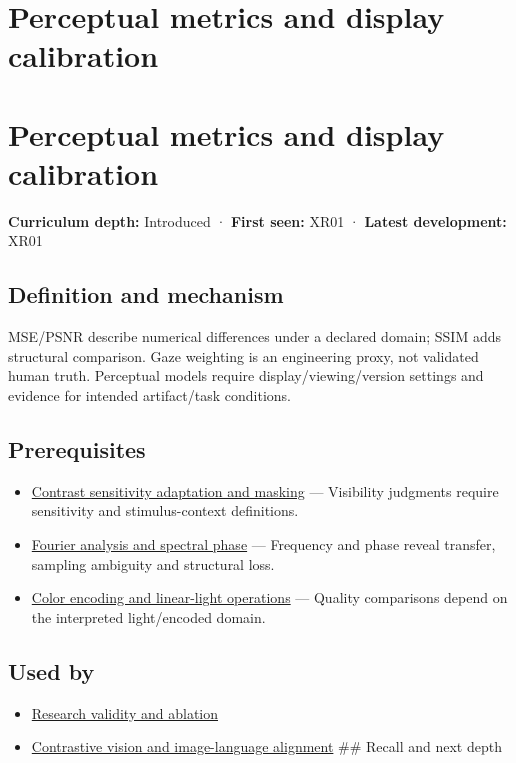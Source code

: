 \hypertarget{appendix-b2c1846508bf}{}
\section*{Perceptual metrics and display calibration}
\section{Perceptual metrics and display calibration}\label{perceptual-metrics-and-display-calibration}

\textbf{Curriculum depth:} Introduced · \textbf{First seen:} XR01 · \textbf{Latest development:} XR01

\subsection{Definition and mechanism}\label{definition-and-mechanism}

MSE/PSNR describe numerical differences under a declared domain; SSIM adds structural comparison. Gaze weighting is an engineering proxy, not validated human truth. Perceptual models require display/viewing/version settings and evidence for intended artifact/task conditions.

\subsection{Prerequisites}\label{prerequisites}

\begin{itemize}
\tightlist
\item
  \hyperref[appendix-b3aa9e8e01ad]{Contrast sensitivity adaptation and masking} --- Visibility judgments require sensitivity and stimulus-context definitions.
\item
  \hyperref[appendix-b60686ba06a1]{Fourier analysis and spectral phase} --- Frequency and phase reveal transfer, sampling ambiguity and structural loss.
\item
  \hyperref[appendix-a9f83ad40792]{Color encoding and linear-light operations} --- Quality comparisons depend on the interpreted light/encoded domain.
\end{itemize}

\subsection{Used by}\label{used-by}

\begin{itemize}
\item
  \hyperref[appendix-65788587ef78]{Research validity and ablation}
\item
  \hyperref[appendix-772f1fd96148]{Contrastive vision and image-language alignment} \#\# Recall and next depth
\end{itemize}

